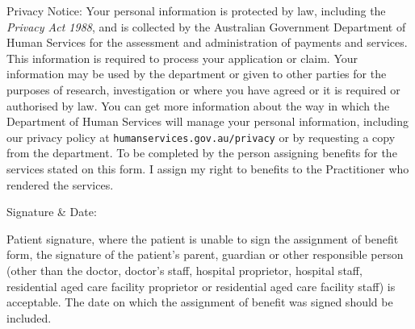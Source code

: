\documentclass[12pt]{article}
\begin{document}
\begin{spacing}{0.3}

{\tiny
Privacy Notice: Your personal information is protected by law, including the \emph{Privacy Act 1988}, and is collected by the Australian Government Department of Human Services for the assessment and administration of payments and services. This information is required to process your application or claim. 
Your information may be used by the department or given to other parties for the purposes of research, investigation or where you have agreed or it is required or authorised by law. 
You can get more information about the way in which the Department of Human Services will manage your personal information, including our privacy policy at \texttt{humanservices.gov.au/privacy} or by requesting a copy from the department. 
To be completed by the person assigning benefits for the services stated on this form. I assign my right to benefits to the Practitioner who rendered the services. }

\vspace{7mm}

Signature \& Date:

\vspace{1.5cm}



{\tiny Patient signature, where the patient is unable to sign the assignment of benefit form, the signature of the patient's parent, guardian or other responsible person (other than the doctor, doctor's staff, hospital proprietor, hospital staff, residential aged care facility proprietor or residential aged care facility staff) is acceptable. 
The date on which the assignment of benefit was signed should be included.}

                            \end{spacing}
\end{document}
